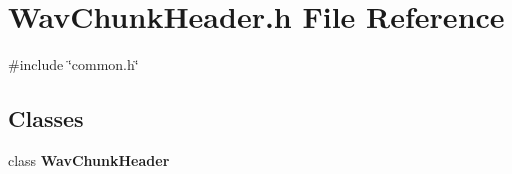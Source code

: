 \section{Wav\+Chunk\+Header.\+h File Reference}
\label{WavChunkHeader_8h}
{\ttfamily \#include \char`\"{}common.\+h\char`\"{}}\newline
\subsection*{Classes}
\begin{DoxyCompactItemize}
\item 
class \textbf{ Wav\+Chunk\+Header}
\end{DoxyCompactItemize}
